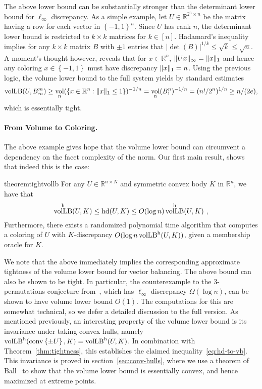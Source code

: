 \documentclass[11pt]{article}
\newcommand{\R}{{\mathbb{R}}}
\newcommand{\set}[1]{\left\{ #1 \right\}}
\DeclareMathOperator{\vollb}{volLB}
\DeclareMathOperator{\hd}{hd}
\DeclareMathOperator{\vol}{vol}
\DeclareMathOperator{\conv}{conv}
\DeclarePairedDelimiter\norm{\lVert}{\rVert}
\begin{document}
The above lower bound can be substantially stronger than the determinant lower
bound for $\ell_\infty$ discrepancy. As a simple example, let $U \in \R^{2^n
\times n}$ be the matrix having a row for each vector in $\set{-1,1}^n$. Since
$U$ has rank $n$, the determinant lower bound is restricted to $k \times k$
matrices for $k \in [n]$. Hadamard's inequality implies for any $k \times k$
matrix $B$ with $\pm 1$ entries that $|\det(B)|^{1/k} \leq \sqrt{k} \leq
\sqrt{n}$. A moment's thought however, reveals that for $x \in \R^n$,
$\norm{Ux}_\infty = \norm{x}_1$ and hence any coloring $x \in \set{-1,1}$ must
have discrepancy $\norm{x}_1 = n$. Using the previous logic, the volume lower
bound to the full system yields by standard estimates
\[
\vollb(U,B^m_\infty) \geq \vol_n(\set{x \in \R^n: \norm{x}_1 \leq 1})^{-1/n}
= \vol_n(B_1^n)^{-1/n} = (n!/2^n)^{1/n} \geq n/(2e), 
\]
which is essentially tight. 

\paragraph{\bf From Volume to Coloring.} The above example gives hope that the
volume lower bound can circumvent a dependency on the facet complexity of
the norm. Our first main result, shows that indeed this is the case:

\begin{restatable}{theorem}{tightvollb} 
\label{thm:tightness}
For any $U \in \R^{n \times N}$ and symmetric convex body $K$ in $\R^n$, we have that
\begin{equation}
\label{eq:tightness}
\vollb^{\rm h}(U,K) \leq \hd(U,K) \leq O(\log n) \vollb^{\rm h}(U,K) \text{ ,}
\end{equation}
Furthermore, there exists a randomized polynomial time algorithm that computes a
coloring of $U$ with $K$-discrepancy $O(\log n \vollb^{\rm h}(U,K))$, given a
membership oracle for $K$. 
\end{restatable}

We note that the above immediately implies the corresponding approximate
tightness of the volume lower bound for vector balancing. The above bound can
also be shown to be tight. In particular, the counterexample to the
3-permutations conjecture from~\cite{NNN12}, which has $\ell_\infty$ discrepancy
$\Omega(\log n)$, can be shown to have volume lower bound $O(1)$. The
computations for this are somewhat technical, so we defer a detailed discussion
to the full version. As mentioned previously, an interesting property of the
volume lower bound is its invariance under taking convex hulls, namely $\vollb^{\rm
h}(\conv\set{\pm U},K) = \vollb^{\rm h}(U,K)$. In combination with
Theorem~\ref{thm:tightness}, this establishes the claimed
inequality~\ref{eq:hd-to-vb}. This invariance is proved in
section~\ref{sec:conv-hulls}, where we use a theorem of Ball~\cite{Ball88} to
show that the volume lower bound is essentially convex, and hence maximized at
extreme points.
\end{document}
